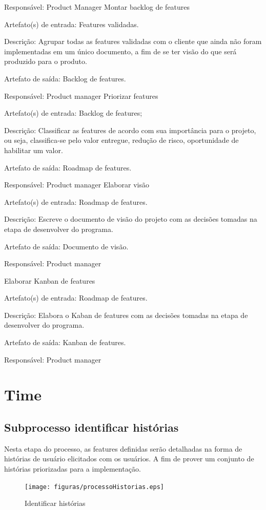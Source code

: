 Responsável: Product Manager
Montar backlog de features

Artefato(s) de entrada: Features validadas.

Descrição: Agrupar todas as features validadas com o cliente que ainda não foram implementadas em um único documento, a fim de se ter visão do que será produzido para o produto.

Artefato de saída: Backlog de features.

Responsável: Product manager
Priorizar features

Artefato(s) de entrada: Backlog de features;

Descrição: Classificar as features de acordo com sua importância para o projeto, ou seja, classifica-se pelo valor entregue, redução de risco, oportunidade de habilitar um valor.

Artefato de saída: Roadmap de features.

Responsável: Product manager
Elaborar visão

Artefato(s) de entrada: Roadmap de features.

Descrição: Escreve o documento de visão do projeto com as decisões tomadas na etapa de desenvolver do programa.

Artefato de saída: Documento de visão.

Responsável: Product manager

Elaborar Kanban de features

Artefato(s) de entrada: Roadmap de features.

Descrição: Elabora o Kaban de features com as decisões tomadas na etapa de desenvolver do programa.

Artefato de saída: Kanban de features.

Responsável: Product manager
\section{Time}
\subsection{ Subprocesso identificar histórias}

Nesta etapa do processo, as features definidas serão detalhadas na forma de histórias de usuário elicitados com os usuários. A fim de prover um conjunto de histórias priorizadas para a implementação.

\begin{figure}[H]
    \centering
    \caption{Identificar histórias}
    \label{processoHistorias}
    \texttt{[image: figuras/processoHistorias.eps]}
\end{figure}


